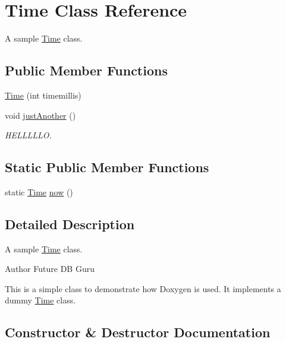 \hypertarget{classTime}{}\section{Time Class Reference}
\label{classTime}


A sample \hyperlink{classTime}{Time} class.  


\subsection*{Public Member Functions}
\begin{DoxyCompactItemize}
\item 
\hyperlink{classTime_a6a0ea6c4a9eae8b51365c5eda0018554}{Time} (int timemillis)
\item 
void \hyperlink{classTime_ae85f93efc2d77b0c02cf9cf5ef2621eb}{just\+Another} ()
\begin{DoxyCompactList}\small\item\em H\+E\+L\+L\+L\+L\+LO. \end{DoxyCompactList}\end{DoxyCompactItemize}
\subsection*{Static Public Member Functions}
\begin{DoxyCompactItemize}
\item 
static \hyperlink{classTime}{Time} \hyperlink{classTime_a4e698154700835119a946be6071a0984}{now} ()
\end{DoxyCompactItemize}


\subsection{Detailed Description}
A sample \hyperlink{classTime}{Time} class. 

\begin{DoxyAuthor}{Author}
Future DB Guru
\end{DoxyAuthor}
This is a simple class to demonstrate how Doxygen is used. It implements a dummy \hyperlink{classTime}{Time} class. 

\subsection{Constructor \& Destructor Documentation}
\mbox{\label{classTime_a6a0ea6c4a9eae8b51365c5eda0018554}} 
